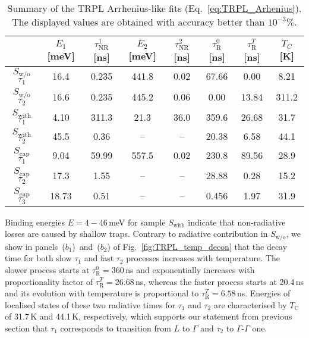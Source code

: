 \begin{table}
	\centering
	\caption{Summary of the TRPL Arrhenius-like fits (Eq.~\ref{eq:TRPL_Arhenius}). The displayed values are obtained with accuracy better than $10^{-3}\%$.}
	\begin{tabularx}{1\textwidth}{cCCCCCCC}
		\toprule
		
		& $E_1$ [meV]& $\tau_\mathrm{NR}^1$ [ns]& $E_2$ [meV]& $\tau_\mathrm{NR}^2$ [ns] & $\tau_\mathrm{R}^0$ [ns]& $\tau_\mathrm{R}^T$ [ns]& $T_C$ [K]\\ 	
		\midrule
		\midrule
		$S_\mathrm{w/o}$ $\tau_1$& 16.4&0.235&441.8 & 0.02& 67.66&0.00&8.21\\
		$S_\mathrm{w/o}$ $\tau_2$& 16.6&0.235&445.2 & 0.06& 0.00&13.84&311.2\\
		\midrule
		
		$S_\mathrm{with}$ $\tau_1$&4.10 & 311.3& 21.3&36.0& 359.6&26.68&31.7\\
		$S_\mathrm{with}$ $\tau_2$&45.5 & 0.36& --&--& 20.38&6.58&44.1\\
		\midrule
		
		$S_\mathrm{cap}$ $\tau_1$& 9.04&59.99&557.5 & 0.02& 230.8&89.56&28.9\\ %
		$S_\mathrm{cap}$ $\tau_2$& 17.3&1.55&-- & --& 28.88&0.28&15.2\\ %
		$S_\mathrm{cap}$ $\tau_3$& 18.73&0.51&-- & --& 0.456&1.97&31.9\\
		
		\bottomrule
	\end{tabularx}\label{tab:TRPL_params}
\end{table}

Binding energies $E=4-46$$\,$meV for sample $S_\mathrm{with}$ indicate that non-radiative losses are caused by shallow traps. Contrary to radiative contribution in $S_\mathrm{w/o}$, we show in panels~($b_1$)~and~($b_2$) of Fig.~\ref{fig:TRPL_temp_decon} that the decay time for both slow $\tau_1$ and fast $\tau_2$ processes increases with temperature. The slower process starts at $\tau_\mathrm{R}^0=360$$\,$ns and exponentially increases with proportionality factor of $\tau_\mathrm{R}^T=26.68$$\,$ns, whereas the faster process starts at 20.4$\,$ns and its evolution with temperature is proportional to $\tau_\mathrm{R}^T=6.58$$\,$ns. Energies of localised states of these two radiative times for $\tau_1$ and $\tau_2$ are characterised by $T_\mathrm{C}$ of 31.7$\,$K and 44.1$\,$K, respectively, which supports our statement from previous section that $\tau_1$ corresponds to transition from $L$ to $\Gamma$ and $\tau_2$ to $\Gamma$-$\Gamma$ one.

